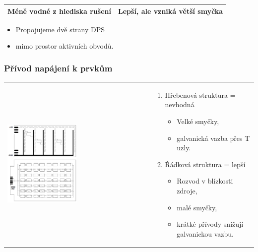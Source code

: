 \documentclass{beamer}
\begin{document}
\begin{frame}
\begin{tabular}{ p{55mm} | p{55mm} }
				Méně vodné z hlediska rušení & Lepší, ale vzniká větší smyčka \\ 
				\hline
			\end{tabular}
			
			
			\begin{itemize}
			  \item Propojujeme dvě strany DPS
				\item mimo prostor aktivních obvodů.
			\end{itemize}
			
  \end{frame}
	
	\begin{frame}
    \frametitle{Přívod napájení k prvkům}  
		
			\begin{tabular}{ p{55mm} p{55mm} }
				\begin{center}
					\includegraphics[width=0.5\textwidth]{obr/rozvod_napajeni_ne_ano.png} 
				\end{center} &
				
				\begin{enumerate}
					\item Hřebenová struktura = nevhodná
					
					\begin{itemize}
						\item Velké smyčky,
						\item galvanická vazba přes T uzly.
					\end{itemize}
					
					\item Řádková struktura = lepší
					
					\begin{itemize}
						\item Rozvod v blízkosti zdroje,
						\item malé smyčky,
						\item krátké přívody snižují galvanickou vazbu.
					\end{itemize}
					

\end{enumerate}
\end{tabular}
\end{frame}
\end{document}
